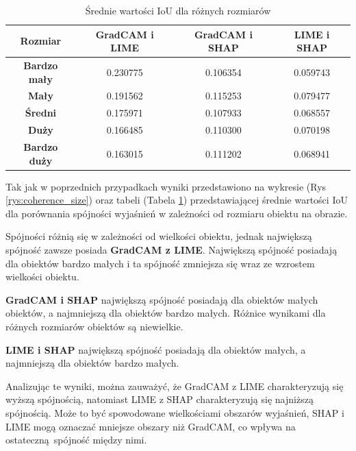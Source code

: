 \begin{table}[h]
	\centering
	\begin{tabular}{|c|c|c|c|}
		\hline
		\textbf{Rozmiar}     & \textbf{GradCAM i LIME} & \textbf{GradCAM i SHAP} & \textbf{LIME i SHAP} \\
		\hline
		\textbf{Bardzo mały} & 0.230775                & 0.106354                & 0.059743             \\
		\hline
		\textbf{Mały}        & 0.191562                & 0.115253                & 0.079477             \\
		\hline
		\textbf{Średni}      & 0.175971                & 0.107933                & 0.068557             \\
		\hline
		\textbf{Duży}        & 0.166485                & 0.110300                & 0.070198             \\
		\hline
		\textbf{Bardzo duży} & 0.163015                & 0.111202                & 0.068941             \\
		\hline
	\end{tabular}
	\caption{Średnie wartości IoU dla różnych rozmiarów}
	\label{tab:base_coherence_size}
\end{table}

Tak jak w poprzednich przypadkach wyniki przedstawiono na wykresie (Rys \ref{rys:coherence_size}) oraz tabeli (Tabela \ref{tab:base_coherence_size}) przedstawiającej średnie wartości IoU dla porównania spójności wyjaśnień w zależności od rozmiaru obiektu na obrazie.

Spójności różnią się w zależności od wielkości obiektu, jednak największą spójność zawsze posiada \textbf{GradCAM z LIME}.
Największą spójność posiadają dla obiektów bardzo małych i ta spójność zmniejsza się wraz ze wzrostem wielkości obiektu.

\textbf{GradCAM i SHAP} największą spójność posiadają dla obiektów małych obiektów, a najmniejszą dla obiektów bardzo małych.
Różnice wynikami dla różnych rozmiarów obiektów są niewielkie.

\textbf{LIME i SHAP} największą spójność posiadają dla obiektów małych, a najmniejszą dla obiektów bardzo małych.

\vspace{1cm}
Analizując te wyniki, można zauważyć, że GradCAM z LIME charakteryzują się wyższą spójnością, natomiast LIME z SHAP charakteryzują się najniższą spójnością.
Może to być spowodowane wielkościami obszarów wyjaśnień, SHAP i LIME mogą oznaczać mniejsze obszary niż GradCAM, co wpływa na ostateczną spójność między nimi.
